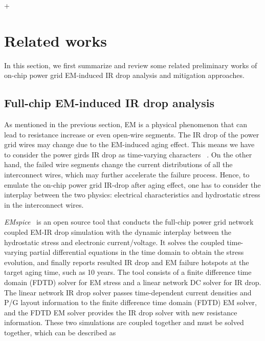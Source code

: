 +\section{Related works}
\label{sec:related}

In this section, we first summarize and review some related preliminary works of on-chip power grid EM-induced IR drop analysis and mitigation approaches.

\subsection{Full-chip EM-induced IR drop analysis}
\label{subsec:emspice}
As mentioned in the previous section, EM is a physical phenomenon that can lead to resistance increase or even open-wire segments.  The IR drop of the power grid wires may change due to the EM-induced aging effect. This means we have to consider the power girds IR drop as time-varying characters ~\cite{SunYu:TDMR'20, Huang:TCAD'15, Chatterjee:2018TCAD,SukharevNajm:2018TDMR}. 
On the other hand, the failed wire segments change the current distributions of all the interconnect wires, which may further accelerate the failure process. Hence, to emulate the on-chip power grid IR-drop after aging effect, one has to consider the interplay between the two physics: electrical characteristics and hydrostatic stress in the interconnect wires.

{\it EMspice}~\cite{SunYu:TDMR'20,EMspiceSourceCode} is an open source tool that conducts the full-chip power grid network coupled EM-IR drop simulation with the dynamic interplay between the hydrostatic stress and electronic current/voltage. It solves the coupled time-varying partial differential equations in the time domain to obtain the stress evolution, and finally reports resulted IR drop and EM failure hotspots at the target aging time, such as 10 years.  The tool consists of a finite difference time domain (FDTD) solver for EM stress and a linear network DC solver for IR drop. The linear network IR drop solver passes time-dependent current densities and P/G layout information to the finite difference time domain (FDTD) EM solver, and the FDTD EM solver provides the IR drop solver with new resistance information. These two simulations are coupled together and must be solved together, which can be described as


